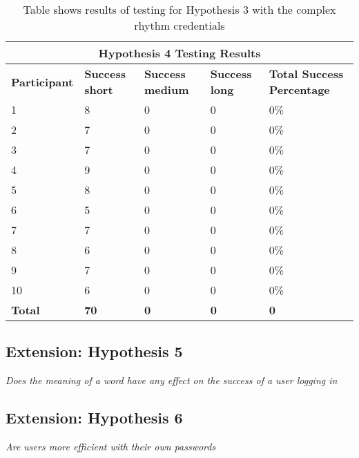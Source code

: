 \documentclass{article}
\begin{document}
{
\begin{table} [H]
\centering
\begin{tabular}{ |p{2cm}|p{2cm}|p{2cm}| p{2cm}| p{2cm}| }
\hline
\multicolumn{5}{|c|}{\textbf{Hypothesis 4 Testing Results}} \\
\hline
\textbf{Participant} & \textbf{Success short} & \textbf{Success medium} & \textbf{Success long}  & \textbf{Total Success Percentage} \\
\hline
1 & 8 & 0 & 0 &  0\% \\
\hline
2 & 7 & 0 & 0 & 0\% \\
\hline
3 & 7 & 0 & 0 & 0\% \\
\hline
4 & 9 & 0 & 0 & 0\%  \\
\hline
5 & 8 & 0 & 0 & 0\% \\
\hline
6 & 5 & 0 & 0 & 0\% \\
\hline
7 & 7 & 0 & 0 & 0\% \\
\hline
8 & 6 & 0 & 0 & 0\% \\
\hline
9 & 7 & 0 & 0 & 0\% \\
\hline
10 & 6 & 0 & 0 & 0\% \\
\hline
\textbf{Total} & \textbf{70} & \textbf{0} & \textbf{0} & \textbf{0} \\
\hline
\end{tabular}
\caption{Table shows results of testing for Hypothesis 3 with the complex rhythm credentials}
\label{table:5}
\end{table}
}


\subsection{Extension: Hypothesis 5}
\begin{center}
\textit{Does the meaning of a word have any effect on the success of a user logging in} \newline \\
\end{center}

\subsection{Extension: Hypothesis 6}
\begin{center}
\textit{Are users more efficient with their own passwords} \newline \\
\end{center}
\end{document}
